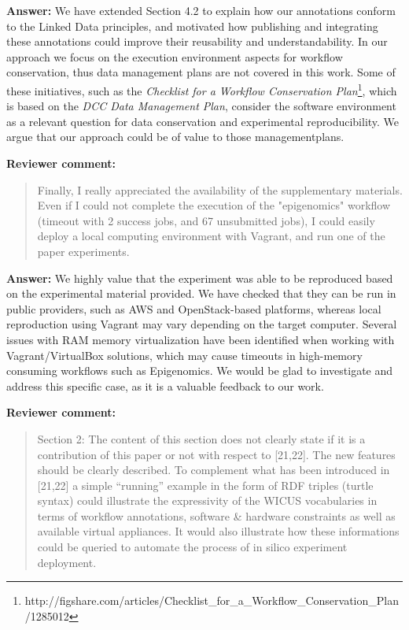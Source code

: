 \documentclass{letter}
\newenvironment{review}%
{\textbf{Reviewer comment:}\begin{quote}}%
{\end{quote}}%
\newcommand{\answer}[1]{%
      \textbf{Answer:} #1}
\begin{document}
\begin{letter}{}
\answer{We have extended Section 4.2 to explain how our annotations conform to the Linked Data principles, and motivated how publishing and integrating these annotations could improve their reusability and understandability. In our approach we focus on the execution environment aspects for workflow conservation, thus data management plans are not covered in this work. Some of these initiatives, such as the {\it Checklist for a Workflow Conservation Plan}\footnote{http://figshare.com/articles/Checklist\_for\_a\_Workflow\_Conservation\_Plan/1285012}, which is based on the {\it DCC Data Management Plan}, consider the software environment as a relevant question for  data conservation and experimental reproducibility. We argue that our approach could be of value to those managementplans.}


\begin{review}
Finally, I really appreciated the availability of the supplementary materials. Even if I could not complete the execution of the "epigenomics" workflow (timeout with 2 success jobs, and 67 unsubmitted jobs), I could easily deploy a local computing environment with Vagrant, and run one of the paper experiments.
\end{review}

\answer{We highly value that the experiment was able to be reproduced based on the experimental material provided. We have checked that they can be run in public providers, such as AWS and OpenStack-based platforms, whereas local reproduction using Vagrant may vary depending on the target computer. Several issues with RAM memory virtualization have been identified when working with Vagrant/VirtualBox solutions, which may cause timeouts in high-memory consuming workflows such as Epigenomics. We would be glad to investigate and address this specific case, as it is a valuable feedback to our work.}


\begin{review}
Section 2: The content of this section does not clearly state if it is a contribution of this paper or not with respect to [21,22]. The new features should be clearly described. To complement what has been introduced in [21,22] a simple ``running'' example in the form of RDF triples (turtle syntax) could illustrate the expressivity of the WICUS vocabularies in terms of workflow annotations, software \& hardware constraints as well as available virtual appliances. It would also illustrate how these informations could be queried to automate the process of in silico experiment deployment.
\end{review}


\end{letter}
\end{document}
